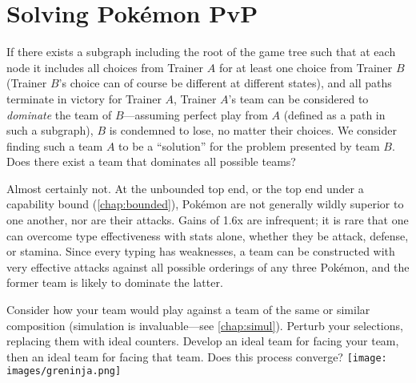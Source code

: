\section{Solving Pokémon PvP}
If there exists a subgraph including the root of the game tree such that at each
  node it includes all choices from Trainer $A$ for at least one choice from Trainer $B$
  (Trainer $B$'s choice can of course be different at different states), and all
  paths terminate in victory for Trainer $A$, Trainer $A$'s team can be considered
  to \textit{dominate} the team of $B$---assuming perfect play from $A$ (defined
  as a path in such a subgraph), $B$ is condemned to lose, no matter their choices.
We consider finding such a team $A$ to be a ``solution'' for the problem presented
  by team $B$.
Does there exist a team that dominates all possible teams?

Almost certainly not.
At the unbounded top end, or the top end under a capability bound (\autoref{chap:bounded}), Pokémon are not generally
  wildly superior to one another, nor are their attacks.
Gains of 1.6x are infrequent; it is rare that one can overcome type
  effectiveness with stats alone, whether they be attack, defense, or stamina.
Since every typing has weaknesses, a team can be constructed with
  very effective attacks against all possible orderings of any three Pokémon,
  and the former team is likely to dominate the latter.

Consider how your team would play against a team of the same or similar composition (simulation
  is invaluable---see \autoref{chap:simul}).
Perturb your selections, replacing them with ideal counters.
Develop an ideal team for facing your team, then an ideal team for facing that team.
Does this process converge?
\vfill{\centering\texttt{[image: images/greninja.png]}}\vfill
